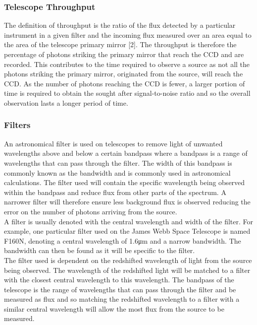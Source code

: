 \documentclass[pdf,color]{UoBnote}
\begin{document}
\subsubsection{Telescope Throughput}
The definition of throughput is the ratio of the flux detected by a particular instrument in a given filter and the incoming flux measured over an area equal to the area of the telescope primary mirror [2]. The throughput is therefore the percentage of photons striking the primary mirror that reach the CCD and are recorded. This contributes to the time required to observe a source as not all the photons striking the primary mirror, originated from the source, will reach the CCD. As the number of photons reaching the CCD is fewer, a larger portion of time is required to obtain the sought after signal-to-noise ratio and so the overall observation lasts a longer period of time.

\subsubsection{Filters}
An astronomical filter is used on telescopes to remove light of unwanted wavelengths above and below a certain bandpass where a bandpass is a range of wavelengths that can pass through the filter. The width of this bandpass is commonly known as the bandwidth and is commonly used in astronomical calculations. The filter used will contain the specific wavelength being observed within the bandpass and reduce flux from other parts of the spectrum. A narrower filter will therefore ensure less background flux is observed reducing the error on the number of photons arriving from the source.\\
\newline
A filter is usually denoted with the central wavelength and width of the filter. For example, one particular filter used on the James Webb Space Telescope is named F160N, denoting a central wavelength of 1.6μm and a narrow bandwidth. The bandwidth can then be found as it will be specific to the filter. \\
\newline
The filter used is dependent on the redshifted wavelength of light from the source being observed. The wavelength of the redshifted light will be matched to a filter with the closest central wavelength to this wavelength. The bandpass of the telescope is the range of wavelengths that can pass through the filter and be measured as flux and so matching the redshifted wavelength to a filter with a similar central wavelength will allow the most flux from the source to be measured.
\end{document}
